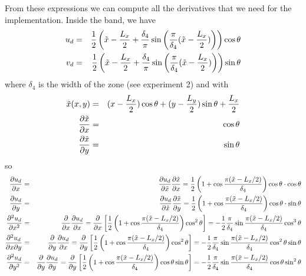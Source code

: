 From these expressions we can compute all the derivatives that we need for the implementation.
Inside the band, we have 
\begin{eqnarray}
u_d &=&  \frac12 \left(\tilde{x}-\frac{L_x}{2} +\frac{\delta_4}{\pi} \sin\left(\frac{\pi}{\delta_4}(\tilde{x}-\frac{L_x}{2}) \right) \right) \cos\theta \nonumber\\
v_d &=&  \frac12 \left(\tilde{x}-\frac{L_x}{2} +\frac{\delta_4}{\pi} \sin\left(\frac{\pi}{\delta_4}(\tilde{x}-\frac{L_x}{2}) \right) \right) \sin\theta \nonumber
\end{eqnarray}
where $\delta_4$ is the width of the zone (see experiment 2) and with 
\begin{eqnarray}
\tilde{x}(x,y) &=& (x-\frac{L_x}{2})  \cos\theta+(y-\frac{L_y}{2}) \sin\theta + \frac{L_x}{2} \nonumber\\
\frac{\partial \tilde{x}}{\partial x} &=& \cos \theta \nonumber\\
\frac{\partial \tilde{x}}{\partial y} &=& \sin \theta \nonumber
\end{eqnarray}
so 
\begin{eqnarray}
\frac{\partial u_d}{\partial x} 
&=& \frac{\partial u_d}{\partial \tilde{x}}  \frac{\partial \tilde{x}}{\partial x} 
= \frac12 \left(1+\cos\frac{ \pi ( \tilde{x}-L_x/2)}{\delta_4} \right) \cos\theta \cdot \cos \theta
\nonumber\\
\frac{\partial u_d}{\partial y} 
&=& \frac{\partial u_d}{\partial \tilde{x}}  \frac{\partial \tilde{x}}{\partial y}
= \frac12 \left(1+\cos\frac{ \pi ( \tilde{x}-L_x/2)}{\delta_4} \right) \cos\theta \cdot \sin\theta 
\nonumber\\
\frac{\partial^2 u_d}{\partial x^2}         
&=& \frac{\partial }{\partial x} \frac{\partial u_d}{\partial x}  
= \frac{\partial }{\partial x} \left[ \frac12 \left(1+\cos\frac{ \pi ( \tilde{x}-L_x/2)}{\delta_4} \right) \cos^2\theta  \right] 
= - \frac12 \frac{\pi}{\delta_4}   \sin\frac{ \pi ( \tilde{x}-L_x/2)}{\delta_4}  \cos^3\theta
\nonumber\\
\frac{\partial^2 u_d}{\partial x \partial y} 
&=& \frac{\partial }{\partial y} \frac{\partial u_d}{\partial x}   
= \frac{\partial }{\partial y} \left[ \frac12 \left(1+\cos\frac{ \pi ( \tilde{x}-L_x/2)}{\delta_4} \right) \cos^2\theta  \right] 
= - \frac12 \frac{\pi}{\delta_4}  \sin\frac{ \pi ( \tilde{x}-L_x/2)}{\delta_4}  \cos^2\theta \sin \theta
\nonumber\\
\frac{\partial^2 u_d}{\partial y^2}          
&=& \frac{\partial }{\partial y} \frac{\partial u_d}{\partial y}  
= \frac{\partial }{\partial y} \left[   \frac12 \left(1+\cos\frac{ \pi ( \tilde{x}-L_x/2)}{\delta_4} \right) \cos\theta \sin\theta      \right] 
= -  \frac12 \frac{\pi}{\delta_4}   \sin\frac{ \pi ( \tilde{x}-L_x/2)}{\delta_4}  \cos\theta \sin^2\theta 
\nonumber
\end{eqnarray}
